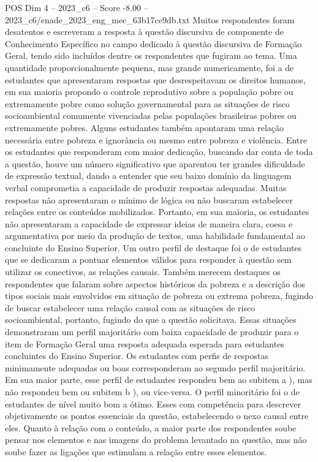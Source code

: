 \begin{textsample}{POS Dim 4 – 2023\_c6 – Score -8.00 – 2023\_c6/enade\_2023\_eng\_mec\_63b17ce9db.txt}
Muitos respondentes foram desatentos e escreveram a resposta à questão discursiva de componente de Conhecimento Específico no campo dedicado à questão discursiva de Formação Geral, tendo sido incluídos dentre os respondentes que fugiram ao tema.
Uma quantidade proporcionalmente pequena, mas grande numericamente, foi a de estudantes que apresentaram respostas que desrespeitavam os direitos humanos, em sua maioria propondo o controle reprodutivo sobre a população pobre ou extremamente pobre como solução governamental para as situações de risco socioambiental comumente vivenciadas pelas populações brasileiras pobres ou extremamente pobres.
Alguns estudantes também apontaram uma relação necessária entre pobreza e ignorância ou mesmo entre pobreza e violência.
Entre os estudantes que responderam com maior dedicação, buscando dar conta de toda a questão, houve um número significativo que aparentou ter grandes dificuldade de expressão textual, dando a entender que seu baixo domínio da linguagem verbal comprometia a capacidade de produzir respostas adequadas.
Muitas respostas não apresentaram o mínimo de lógica ou não buscaram estabelecer relações entre os conteúdos mobilizados.
Portanto, em sua maioria, os estudantes não apresentaram a capacidade de expressar ideias de maneira clara, coesa e argumentativa por meio da produção de textos, uma habilidade fundamental ao concluinte do Ensino Superior.
Um outro perfil de destaque foi o de estudantes que se dedicaram a pontuar elementos válidos para responder à questão sem utilizar os conectivos, as relações causais.
Também merecem destaques os respondentes que falaram sobre aspectos históricos da pobreza e a descrição dos tipos sociais mais envolvidos em situação de pobreza ou extrema pobreza, fugindo de buscar estabelecer uma relação causal com as situações de risco socioambiental, portanto, fugindo do que a questão solicitava.
Essas situações demonstraram um perfil majoritário com baixa capacidade de produzir para o item de Formação Geral uma resposta adequada esperada para estudantes concluintes do Ensino Superior.
Os estudantes com perfis de respostas minimamente adequadas ou boas corresponderam ao segundo perfil majoritário.
Em sua maior parte, esse perfil de estudantes respondeu bem ao subitem a ), mas não respondeu bem ou subitem b ), ou vice-versa.
O perfil minoritário foi o de estudantes de nível muito bom a ótimo.
Esses com competência para descrever objetivamente os pontos essenciais da questão, estabelecendo o nexo causal entre eles.
Quanto à relação com o conteúdo, a maior parte dos respondentes soube pensar nos elementos e nas imagens do problema levantado na questão, mas não soube fazer as ligações que estimulam a relação entre esses elementos.

\end{textsample}
